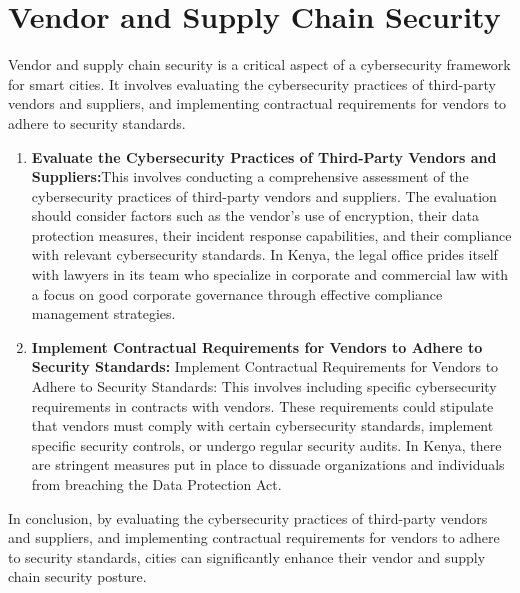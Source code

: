 \documentclass{article}
\begin{document}
\section{Vendor and Supply Chain Security}
Vendor and supply chain security is a critical aspect of a cybersecurity framework for smart cities. It involves evaluating the cybersecurity practices of third-party vendors and suppliers, and implementing contractual requirements for vendors to adhere to security standards\cite{biniyaz-2023}\cite{ramos-2021}\cite{bahr-2023}.
\begin{enumerate}[label=\alph*)]
    \item \textbf{Evaluate the Cybersecurity Practices of Third-Party Vendors and Suppliers:}This involves conducting a comprehensive assessment of the cybersecurity practices of third-party vendors and suppliers\cite{biniyaz-2023}\cite{ramos-2021}\cite{bahr-2023}. The evaluation should consider factors such as the vendor’s use of encryption, their data protection measures, their incident response capabilities, and their compliance with relevant cybersecurity standards\cite{biniyaz-2023}\cite{ramos-2021}\cite{bahr-2023}. In Kenya, the legal office prides itself with lawyers in its team who specialize in corporate and commercial law with a focus on good corporate governance through effective compliance management strategies\cite{adala-2022}.
    \item \textbf{Implement Contractual Requirements for Vendors to Adhere to Security Standards:} Implement Contractual Requirements for Vendors to Adhere to Security Standards: This involves including specific cybersecurity requirements in contracts with vendors\cite{biniyaz-2023}\cite{ramos-2021}\cite{bahr-2023}. These requirements could stipulate that vendors must comply with certain cybersecurity standards, implement specific security controls, or undergo regular security audits\cite{biniyaz-2023}\cite{ramos-2021}\cite{bahr-2023}. In Kenya, there are stringent measures put in place to dissuade organizations and individuals from breaching the Data Protection Act\cite{muthui-2020}.

 

\end{enumerate}
In conclusion, by evaluating the cybersecurity practices of third-party vendors and suppliers, and implementing contractual requirements for vendors to adhere to security standards, cities can significantly enhance their vendor and supply chain security posture\cite{biniyaz-2023}\cite{ramos-2021}\cite{bahr-2023}.
\end{document}

